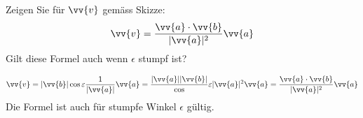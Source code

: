 \begin{exercisesKapitel}
\begin{exercise}
Zeigen Sie für $\vv{v}$ gemäss Skizze:
\[ \vv{v} = \frac{\vv{a} \cdot \vv{b}}{|\vv{a}|^{2}} \vv{a} \]
Gilt diese Formel auch wenn $\epsilon$ stumpf ist?
\begin{answer}
\[ \vv{v} = |\vv{b}| \cos{\epsilon} \frac{1}{|\vv{a}|} \vv{a} = \frac{|\vv{a}| |\vv{b}|} \cos{\epsilon}{|\vv{a}|^{2}} \vv{a} =\frac{\vv{a} \cdot \vv{b}}{|\vv{a}|^{2}} \vv{a}\]
Die Formel ist auch für stumpfe Winkel $\epsilon$ gültig.
\end{answer}
\end{exercise}



\end{exercisesKapitel}